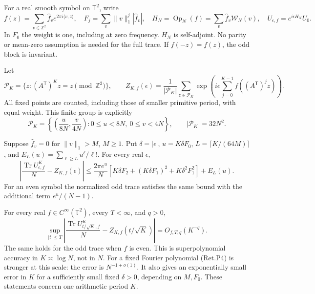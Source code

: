 For a real smooth symbol on \(\mathbb T^2\), write
\[
 f(z)=\sum_{v\in\mathbb Z^2}\widehat f_v e^{2\pi i\langle v,z\rangle},
 \quad F_j=\sum_v\|v\|_1^j|\widehat f_v|,\quad
 H_N=\operatorname{Op}_N(f)=\sum_v\widehat f_v\mathcal W_N(v),
 \quad U_{\epsilon,f}=e^{i\epsilon H_N}U_0 .
\]
In \(F_0\) the weight is one, including at zero frequency.
\(H_N\) is self-adjoint. No parity or mean-zero assumption is needed
for the full trace. If \(f(-z)=f(z)\), the odd block is invariant.

Let
\[
 \mathcal P_K=\{z:(A^{\mathsf T})^Kz=z\pmod{\mathbb Z^2}\},\qquad
 Z_{K,f}(\epsilon)=\frac1{|\mathcal P_K|}
       \sum_{z\in\mathcal P_K}
       \exp\left(i\epsilon\sum_{j=0}^{K-1}f((A^{\mathsf T})^jz)\right).
                                                               \tag{Ret.P2}
\]
All fixed points are counted, including those of smaller primitive period,
with equal weight. This finite group is explicitly
\[
 \mathcal P_K=
 \left\{\left(\frac{u}{8N},\frac{v}{4N}\right):
             0\le u<8N,\ 0\le v<4N\right\},\qquad
                         |\mathcal P_K|=32N^2.             \tag{Ret.P3}
\]

\begin{theorem}\label{pass1:return_periodic-1}
Suppose \(\widehat f_v=0\) for \(\|v\|_1>M\), \(M\ge1\).
Put \(\delta=|\epsilon|\), \(u=K\delta F_0\),
\(L=\lceil K/(64M)\rceil\), and
\(E_L(u)=\sum_{\ell\ge L}u^\ell/\ell!\).
For every real \(\epsilon\),
\[
 \left|\frac{\operatorname{Tr}U_{\epsilon,f}^K}{N}
                                  -Z_{K,f}(\epsilon)\right|
 \le \frac{2\pi e^u}{N}
       \left[K\delta F_2+(K\delta F_1)^2+K\delta^2F_1^2\right]
                                      +E_L(u).             \tag{Ret.P4}
\]
For an even symbol the normalized odd trace satisfies the same bound
with the additional term \(e^u/(N-1)\).
\end{theorem}

\begin{theorem}\label{pass1:return_periodic-2}
For every real \(f\in C^\infty(\mathbb T^2)\), every \(T<\infty\), and \(q>0\),
\[
 \sup_{|t|\le T}
 \left|\frac{\operatorname{Tr}U_{t/\sqrt K,f}^K}{N}
                         -Z_{K,f}(t/\sqrt K)\right|
                        =O_{f,T,q}(K^{-q}).                \tag{Ret.P5}
\]
The same holds for the odd trace when \(f\) is even.
This is superpolynomial accuracy in \(K\asymp\log N\), not in \(N\).
For a fixed Fourier polynomial (Ret.P4) is stronger at this scale:
the error is \(N^{-1+o(1)}\).
It also gives an exponentially small error in \(K\) for a sufficiently
small fixed \(\delta>0\), depending on \(M,F_0\).
These statements concern one arithmetic period \(K\).
\end{theorem}

